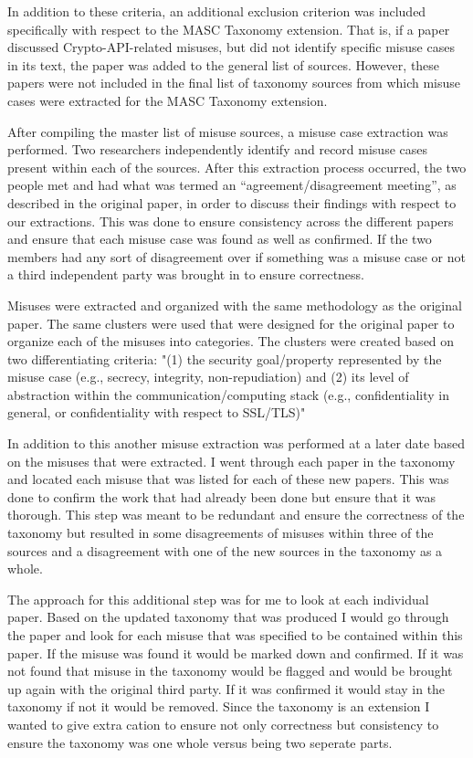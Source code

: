 In addition to these criteria, an additional exclusion criterion was included specifically with respect to the MASC Taxonomy extension.  That is, if a paper discussed Crypto-API-related misuses, but did not identify specific misuse cases in its text, the paper was added to the general list of sources.  However, these papers were not included in the final list of taxonomy sources from which misuse cases were extracted for the MASC Taxonomy extension.

After compiling the master list of misuse sources, a misuse case extraction was performed. Two researchers independently identify and record misuse cases present within each of the sources. After this extraction process occurred, the two people  met and had what was termed an “agreement/disagreement meeting”, as described in the original paper, in order to discuss their findings with respect to our extractions.  This was done to ensure consistency across the different papers and ensure that each misuse case was found as well as confirmed. If the two members had any sort of disagreement over if something was a misuse case or not a third independent party was brought in to ensure correctness. 

Misuses were extracted and organized with the same methodology as the original paper. The same clusters were used that were designed for the original paper to organize each of the misuses into categories. The clusters were created based on two differentiating criteria: "(1) the security goal/property represented by the misuse case  (e.g., secrecy, integrity, non-repudiation) and (2) its level of abstraction within the communication/computing stack (e.g., confidentiality in general, or confidentiality with respect to SSL/TLS)"
    
In addition to this another misuse extraction was performed at a later date based on the misuses that were extracted. I went through each paper in the taxonomy and located each misuse that was listed for each of these new papers. This was done to confirm the work that had already been done but ensure that it was thorough. This step was meant to be redundant and ensure the correctness of the taxonomy but resulted in some disagreements of misuses within three of the sources and a disagreement with one of the new sources in the taxonomy as a whole. 

The approach for this additional step was for me to look at each individual paper. Based on the updated taxonomy that was produced I would go through the paper and look for each misuse that was specified to be contained within this paper. If the misuse was found it would be marked down and confirmed. If it was not found that misuse in the taxonomy would be flagged and would be brought up again with the original third party. If it was confirmed it would stay in the taxonomy if not it would be removed. Since the taxonomy is an extension I wanted to give extra cation to ensure not only correctness but consistency to ensure the taxonomy was one whole versus being two seperate parts.
  
